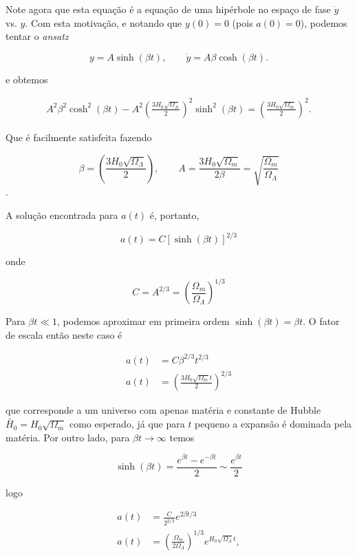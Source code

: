 \documentclass[a4paper, 12pt, notitlepage]{article}
\begin{document}
\begin{enumerate}
\noindent Note agora que esta equação é a equação de uma hipérbole no espaço de fase $\dot{y}$ vs. $y$. Com esta motivação, e notando que $y(0) = 0$ (pois $a(0) = 0$), podemos tentar o \textit{ansatz}

$$ y = A \sinh(\beta t), \qquad \dot{y} = A \beta \cosh(\beta t). $$

\noindent e obtemos

\begin{align*}
  A^2 \beta^2 \cosh^2(\beta t) - A^2 \left(\frac{3 H_0 \sqrt{\Omega_\Lambda}}{2}\right)^2 \sinh^2(\beta t) = \left(\frac{3 H_0 \sqrt{\Omega_m}}{2}\right)^2.
\end{align*}

Que é facilmente satisfeita fazendo

$$ \beta = \left(\frac{3H_0\sqrt{\Omega_\Lambda}}{2}\right), \qquad A = \frac{3H_0 \sqrt{\Omega_m}}{2\beta} = \sqrt{\frac{\Omega_m}{\Omega_\Lambda}} $$.

A solução encontrada para $a(t)$ é, portanto,

\begin{equation*}
  a(t) = C \left[ \sinh(\beta t)\right]^{2/3}
\end{equation*}

\noindent onde

$$ C = A^{2/3} = \left(\frac{\Omega_m}{\Omega_\Lambda}\right)^{1/3} $$ 

Para $\beta t \ll 1$, podemos aproximar em primeira ordem $\sinh(\beta t) = \beta t$. O fator de escala então neste caso é

\begin{align*}
  a(t) &= C\beta^{2/3} t^{2/3} \\
  a(t) &= \left(\frac{3H_0 \sqrt{\Omega_m} t}{2}\right)^{2/3}
\end{align*}

\noindent que corresponde a um universo com apenas matéria e constante de Hubble $\widetilde{H_0} = H_0\sqrt{\Omega_m}$ como esperado, já que para $t$ pequeno a expansão é dominada pela matéria. Por outro lado, para $\beta t \to \infty$ temos

$$ \sinh(\beta t) = \frac{e^{\beta t} - e^{-\beta t}}{2} \sim \frac{e^{\beta t}}{2} $$

\noindent logo

\begin{align*}
  a(t) &= \frac{C}{2^{2/3}} e^{2\beta t/3} \\
  a(t) &= \left(\frac{\Omega_m}{2\Omega_\Lambda}\right)^{1/3} e^{H_0\sqrt{\Omega_\Lambda}t},
\end{align*}


\end{enumerate}
\end{document}
